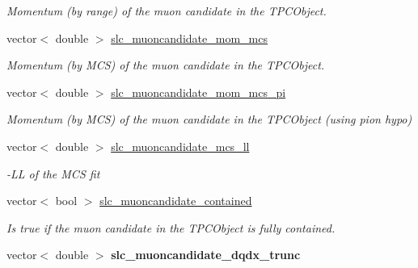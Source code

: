 \begin{DoxyCompactItemize}
\begin{DoxyCompactList}\small\item\em Momentum (by range) of the muon candidate in the T\-P\-C\-Object. \end{DoxyCompactList}\item 
\hypertarget{classUBXSecEvent_abfd994bade285f9f67f74f1a210f5422}{vector$<$ double $>$ \hyperlink{classUBXSecEvent_abfd994bade285f9f67f74f1a210f5422}{slc\-\_\-muoncandidate\-\_\-mom\-\_\-mcs}}\label{classUBXSecEvent_abfd994bade285f9f67f74f1a210f5422}

\begin{DoxyCompactList}\small\item\em Momentum (by M\-C\-S) of the muon candidate in the T\-P\-C\-Object. \end{DoxyCompactList}\item 
\hypertarget{classUBXSecEvent_a28a09d3ac5399de319c2fb2d31ea0652}{vector$<$ double $>$ \hyperlink{classUBXSecEvent_a28a09d3ac5399de319c2fb2d31ea0652}{slc\-\_\-muoncandidate\-\_\-mom\-\_\-mcs\-\_\-pi}}\label{classUBXSecEvent_a28a09d3ac5399de319c2fb2d31ea0652}

\begin{DoxyCompactList}\small\item\em Momentum (by M\-C\-S) of the muon candidate in the T\-P\-C\-Object (using pion hypo) \end{DoxyCompactList}\item 
\hypertarget{classUBXSecEvent_a7342f551004e2275665345afe33d21a2}{vector$<$ double $>$ \hyperlink{classUBXSecEvent_a7342f551004e2275665345afe33d21a2}{slc\-\_\-muoncandidate\-\_\-mcs\-\_\-ll}}\label{classUBXSecEvent_a7342f551004e2275665345afe33d21a2}

\begin{DoxyCompactList}\small\item\em -\/\-L\-L of the M\-C\-S fit \end{DoxyCompactList}\item 
\hypertarget{classUBXSecEvent_acece0aff774df48cee7bd4146870c559}{vector$<$ bool $>$ \hyperlink{classUBXSecEvent_acece0aff774df48cee7bd4146870c559}{slc\-\_\-muoncandidate\-\_\-contained}}\label{classUBXSecEvent_acece0aff774df48cee7bd4146870c559}

\begin{DoxyCompactList}\small\item\em Is true if the muon candidate in the T\-P\-C\-Object is fully contained. \end{DoxyCompactList}\item 
\hypertarget{classUBXSecEvent_aec6e2338e43e8cd376f3eb7f9785b744}{vector$<$ double $>$ {\bfseries slc\-\_\-muoncandidate\-\_\-dqdx\-\_\-trunc}}\label{classUBXSecEvent_aec6e2338e43e8cd376f3eb7f9785b744}


\end{DoxyCompactItemize}
